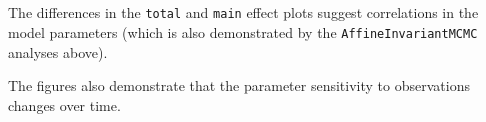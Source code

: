 \documentclass[11pt]{article}
\begin{document}
    \begin{center}
    \end{center}
    { \hspace*{\fill} \\}
    
    \begin{center}
    \end{center}
    { \hspace*{\fill} \\}
    
    \begin{Verbatim}[commandchars=\\\{\}]

    \end{Verbatim}

    \begin{center}
    \end{center}
    { \hspace*{\fill} \\}
    
    \begin{Verbatim}[commandchars=\\\{\}]

    \end{Verbatim}

    \begin{center}
    \end{center}
    { \hspace*{\fill} \\}
    
    \begin{Verbatim}[commandchars=\\\{\}]

    \end{Verbatim}

    The differences in the \texttt{total} and \texttt{main} effect plots
suggest correlations in the model parameters (which is also demonstrated
by the \texttt{AffineInvariantMCMC} analyses above).

The figures also demonstrate that the parameter sensitivity to
observations changes over time.
\end{document}
